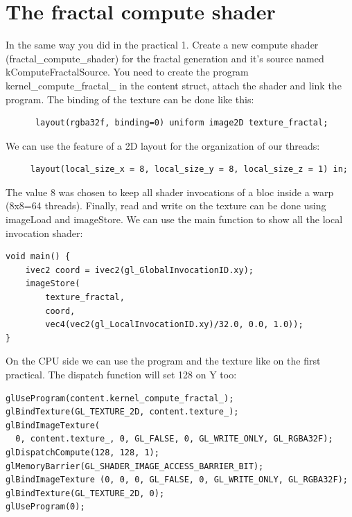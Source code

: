 \documentclass{article}
\begin{document}
\section{The fractal compute shader}
In the same way you did in the practical 1. Create a new compute shader (fractal\_compute\_shader) for the fractal generation and it's source named kComputeFractalSource. You need to create the program kernel\_compute\_fractal\_ in the content struct, attach the shader and link the program.
The binding of the texture can be done like this:
\begin{lstlisting}
	  layout(rgba32f, binding=0) uniform image2D texture_fractal;
\end{lstlisting}
We can use the feature of a 2D layout for the organization of our threads:
\begin{lstlisting}
	 layout(local_size_x = 8, local_size_y = 8, local_size_z = 1) in;
\end{lstlisting}
The value 8 was chosen to keep all shader invocations of a bloc inside a warp (8x8=64 threads). Finally, read and write on the texture can be done using imageLoad and imageStore. We can use the main function to show all the local invocation shader:
\begin{lstlisting}
void main() {
	ivec2 coord = ivec2(gl_GlobalInvocationID.xy);
	imageStore(
		texture_fractal,
		coord,
		vec4(vec2(gl_LocalInvocationID.xy)/32.0, 0.0, 1.0));
}
\end{lstlisting}
On the CPU side we can use the program and the texture like on the first practical. The dispatch function will set 128 on Y too:
\begin{lstlisting}
glUseProgram(content.kernel_compute_fractal_);
glBindTexture(GL_TEXTURE_2D, content.texture_);
glBindImageTexture(
  0, content.texture_, 0, GL_FALSE, 0, GL_WRITE_ONLY, GL_RGBA32F);
glDispatchCompute(128, 128, 1);
glMemoryBarrier(GL_SHADER_IMAGE_ACCESS_BARRIER_BIT);
glBindImageTexture (0, 0, 0, GL_FALSE, 0, GL_WRITE_ONLY, GL_RGBA32F);
glBindTexture(GL_TEXTURE_2D, 0);
glUseProgram(0);
\end{lstlisting}
\end{document}
